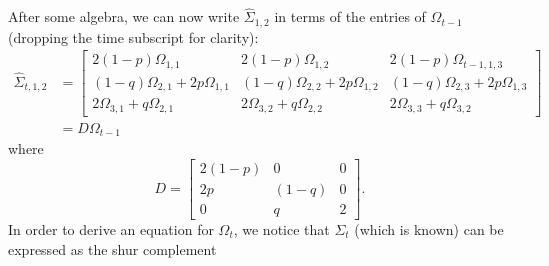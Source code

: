\documentclass{article}
\begin{document}
After some algebra, we can now write $\hat{\Sigma}_{1,2}$ in terms of the entries of $\Omega_{t-1}$ (dropping the time subscript for clarity): 
\begin{align}
\hat{\Sigma}_{t,1,2} &=\left[ \begin{array}{ccc}
2(1-p)\Omega_{1,1}  & 2(1-p) \Omega_{1,2}  & 2(1-p) \Omega_{t-1,1,3} \\
(1-q) \Omega_{2,1} + 2 p \Omega_{1,1}&(1-q)\Omega_{2,2} + 2p \Omega_{1,2}  &(1-q) \Omega_{2,3} + 2p \Omega_{1,3}\\
2\Omega_{3,1} + q \Omega_{2,1} &2 \Omega_{3,2} + q \Omega_{2,2}  &2\Omega_{3,3} + q \Omega_{3,2}
\end{array}\right]\\
&= D\Omega_{t-1}
\end{align}
where
\begin{equation}
D = \left[ \begin{array}{ccc}
2(1-p)  &0  &0 \\
2p  & (1-q)  & 0 \\
0 & q  &2
\end{array}\right].
\end{equation}
In order to derive an equation for $\Omega_t$, we notice that $\Sigma_t$ (which is known) can be expressed as the shur complement 
\end{document}
